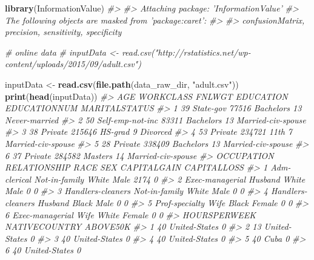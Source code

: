 \documentclass[]{book}
\newenvironment{Shaded}{\begin{snugshade}}{\end{snugshade}}
\newcommand{\CommentTok}[1]{\textcolor[rgb]{0.56,0.35,0.01}{\textit{#1}}}
\newcommand{\KeywordTok}[1]{\textcolor[rgb]{0.13,0.29,0.53}{\textbf{#1}}}
\newcommand{\NormalTok}[1]{#1}
\newcommand{\StringTok}[1]{\textcolor[rgb]{0.31,0.60,0.02}{#1}}
\begin{document}
\begin{Shaded}
\begin{Highlighting}[]
\KeywordTok{library}\NormalTok{(InformationValue)}
\CommentTok{#> }
\CommentTok{#> Attaching package: 'InformationValue'}
\CommentTok{#> The following objects are masked from 'package:caret':}
\CommentTok{#> }
\CommentTok{#>     confusionMatrix, precision, sensitivity, specificity}

\CommentTok{# online data}
\CommentTok{# inputData <- read.csv("http://rstatistics.net/wp-content/uploads/2015/09/adult.csv")}

\NormalTok{inputData <-}\StringTok{ }\KeywordTok{read.csv}\NormalTok{(}\KeywordTok{file.path}\NormalTok{(data_raw_dir, }\StringTok{"adult.csv"}\NormalTok{))}
\KeywordTok{print}\NormalTok{(}\KeywordTok{head}\NormalTok{(inputData))}
\CommentTok{#>   AGE        WORKCLASS FNLWGT EDUCATION EDUCATIONNUM      MARITALSTATUS}
\CommentTok{#> 1  39        State-gov  77516 Bachelors           13      Never-married}
\CommentTok{#> 2  50 Self-emp-not-inc  83311 Bachelors           13 Married-civ-spouse}
\CommentTok{#> 3  38          Private 215646   HS-grad            9           Divorced}
\CommentTok{#> 4  53          Private 234721      11th            7 Married-civ-spouse}
\CommentTok{#> 5  28          Private 338409 Bachelors           13 Married-civ-spouse}
\CommentTok{#> 6  37          Private 284582   Masters           14 Married-civ-spouse}
\CommentTok{#>          OCCUPATION  RELATIONSHIP  RACE    SEX CAPITALGAIN CAPITALLOSS}
\CommentTok{#> 1      Adm-clerical Not-in-family White   Male        2174           0}
\CommentTok{#> 2   Exec-managerial       Husband White   Male           0           0}
\CommentTok{#> 3 Handlers-cleaners Not-in-family White   Male           0           0}
\CommentTok{#> 4 Handlers-cleaners       Husband Black   Male           0           0}
\CommentTok{#> 5    Prof-specialty          Wife Black Female           0           0}
\CommentTok{#> 6   Exec-managerial          Wife White Female           0           0}
\CommentTok{#>   HOURSPERWEEK NATIVECOUNTRY ABOVE50K}
\CommentTok{#> 1           40 United-States        0}
\CommentTok{#> 2           13 United-States        0}
\CommentTok{#> 3           40 United-States        0}
\CommentTok{#> 4           40 United-States        0}
\CommentTok{#> 5           40          Cuba        0}
\CommentTok{#> 6           40 United-States        0}
\end{Highlighting}
\end{Shaded}
\end{document}
